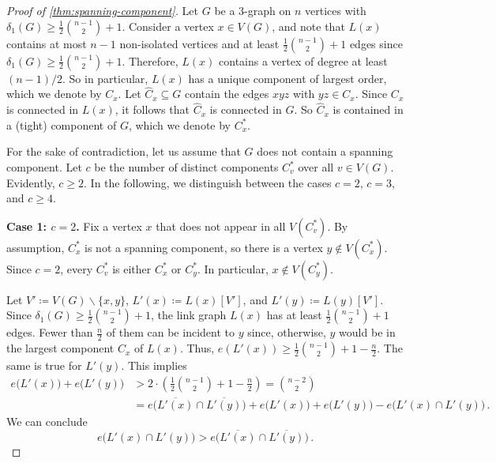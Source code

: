 \documentclass[10pt,a4paper]{amsart}
\renewcommand{\subset}{\subseteq}
\begin{document}
	\begin{proof}[Proof of \cref{thm:spanning-component}]
		Let $G$ be a $3$-graph on $n$ vertices with $\delta_1(G) \geq \tfrac{1}{2}\binom{n-1}{2}+1$.
		Consider a vertex $x \in V(G)$, and note that $L(x)$ contains at most $n-1$ non-isolated vertices and at least $\tfrac{1}{2} \binom{n-1}{2} + 1$ edges since $\delta_1(G) \geq \tfrac{1}{2} \binom{n-1}{2} + 1$. Therefore, $L(x)$ contains a vertex of degree at least $(n-1)/2$. 
		So in particular, $L(x)$ has a unique component of largest order, which we denote by $C_x$.
		Let $\hat C_x \subset G$ contain the edges $xyz$ with $yz \in C_x$.
		Since $C_x$ is connected in $L(x)$, it follows that $\hat C_x$ is connected in $G$.
		So $\hat C_x$ is contained in a (tight) component of $G$, which we denote by $C_x^\ast$.
		
		For the sake of contradiction, let us assume that $G$ does not contain a spanning component.
		Let $c$ be the number of distinct components $C_v^\ast$ over all $v \in V(G)$.
		Evidently, $c \geq 2$.
		In the following, we distinguish between the cases $c=2$, $c=3$, and $c\geq 4$.
		
		\medskip
		\textbf{Case 1: $c=2$.}
		Fix a vertex $x$ that does not appear in all $V(C_v^\ast)$. By assumption, $C_x^\ast$ is not a spanning component, so there is a vertex $y\not\in V(C_x^\ast)$. Since $c=2$, every $C_v^\ast$ is either $C_x^\ast$ or $C_y^\ast$. In particular, $x\not\in V(C_y^\ast)$.
		
		Let $V'\coloneqq V(G)\backslash\{x,y\}$, $L'(x)\coloneq L(x)[V']$, and $L'(y)\coloneqq L(y)[V']$. 
		Since $\delta_1(G) \geq \tfrac{1}{2} \binom{n-1}{2} + 1$, the link graph $L(x)$ has at least $\frac{1}{2}\binom{n-1}{2}+1$ edges. Fewer than $\frac{n}{2}$ of them can be incident to $y$ since, otherwise, $y$ would be in the largest component $C_x$ of $L(x)$. Thus, $e(L'(x))\ge \frac{1}{2}\binom{n-1}{2}+1-\frac{n}{2}$. The same is true for $L'(y)$. This implies \begin{align*}
			e\big(L'(x)\big)+e\big(L'(y)\big)&>2\cdot\!\left(\frac{1}{2}\binom{n-1}{2}+1-\frac{n}{2}\right)
			=\binom{n-2}{2}\\&=e\big(\overline{L'(x)}\cap\overline{L'(y)}\big)+e\big(L'(x)\big)+e\big(L'(y)\big)-e\big(L'(x)\cap L'(y)\big)\,.
		\end{align*}
		We can conclude 
		\begin{equation}\label{eq: more in cap than the complement}
			e\big(L'(x)\cap L'(y)\big)>e\big(\overline{L'(x)}\cap\overline{L'(y)}\big)\,.
		\end{equation}
		

\end{proof}
\end{document}
